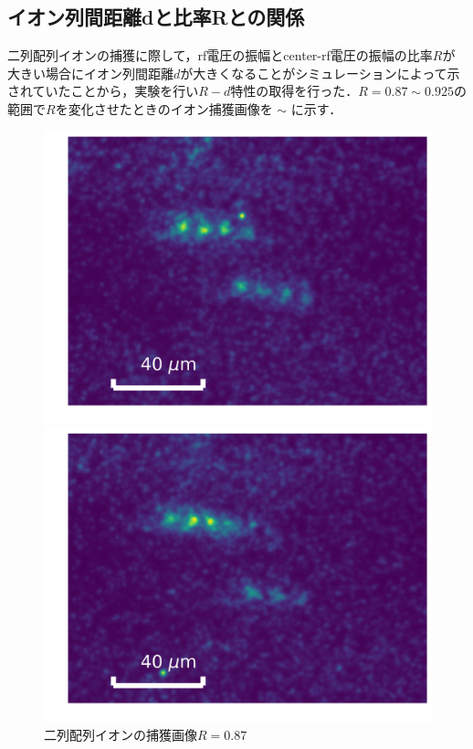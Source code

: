 \subsection{イオン列間距離dと比率Rとの関係}
二列配列イオンの捕獲に際して，rf電圧の振幅とcenter-rf電圧の振幅の比率$R$が大きい場合にイオン列間距離$d$が大きくなることがシミュレーションによって示されていたことから，実験を行い$R-d$特性の取得を行った．$R = 0.87 \sim 0.925$の範囲で$R$を変化させたときのイオン捕獲画像を $\sim$ に示す．
\begin{figure}[h]
	\begin{minipage}{0.33\linewidth}
		\begin{center}
			\includegraphics[width = 0.8\columnwidth]{./results/figure/2D_087.jpg}
			\caption{二列配列イオンの捕獲画像$R = 0.87$}
			\label{fig:2D_087}
		\end{center}
	\end{minipage}
	\begin{minipage}{0.33\linewidth}
		\begin{center}
			\includegraphics[width = 0.8\columnwidth]{./results/figure/2D_088_0.jpg}

\end{center}
\end{minipage}
\end{figure}
